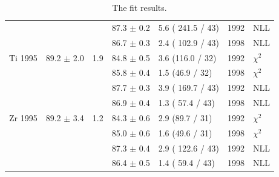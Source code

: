 \begin{table}[h]
\begin{center}
\begin{tabular}{|l||l|l|l|l|l|l|}
                &                &     & 87.3 $\pm$ 0.2 & 5.6 ( 241.5 / 43) & 1992 & NLL \\
                &                &     & 86.7 $\pm$ 0.3 & 2.4 ( 102.9 / 43)& 1998 & NLL \\
      \hline                                                                
       Ti 1995   & 89.2 $\pm$ 2.0 & 1.9 &84.8 $\pm$ 0.5 &  3.6 (116.0 / 32) & 1992 & $\chi^2$ \\  
                 &                &     &85.8 $\pm$ 0.4 &  1.5 (46.9 / 32)  & 1998 & $\chi^2$ \\  
                                                                            
                &                &     & 87.7 $\pm$ 0.3 & 3.9 ( 169.7 / 43) & 1992 & NLL \\
                &                &     & 86.9 $\pm$ 0.4 & 1.3 ( 57.4 / 43) & 1998 & NLL \\
      \hline                                                                
       Zr 1995   & 89.2 $\pm$ 3.4 & 1.2 &84.3 $\pm$ 0.6 &  2.9 (89.7 / 31)  & 1992 & $\chi^2$ \\  
                 &                &     &85.0 $\pm$ 0.6 &  1.6 (49.6 / 31)  & 1998 & $\chi^2$ \\  
                                                                            
                &                &     & 87.3 $\pm$ 0.4 & 2.9 ( 122.6 / 43) & 1992 & NLL \\
                &                &     & 86.4 $\pm$ 0.5 & 1.4 ( 59.4 / 43) & 1998 & NLL \\
      \hline
                                                                                
    \end{tabular}
  \end{center}
  \caption{The fit results.}
  \label{table:fits1995}
\end{table}


